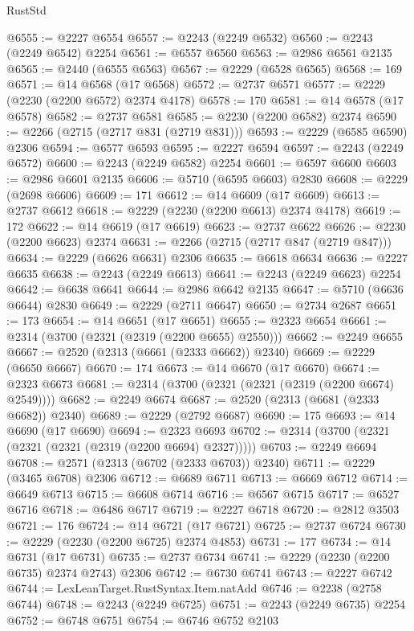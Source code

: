 \begin{lexlean}{RustStd}
\begin{coremodule}
@6555 := @2227 @6554
@6557 := @2243 (@2249 @6532)
@6560 := @2243 (@2249 @6542) @2254
@6561 := @6557 @6560
@6563 := @2986 @6561 @2135
@6565 := @2440 (@6555 @6563)
@6567 := @2229 (@6528 @6565)
@6568 := 169
@6571 := @14 @6568 (@17 @6568)
@6572 := @2737 @6571
@6577 := @2229 (@2230 (@2200 @6572) @2374 @4178)
@6578 := 170
@6581 := @14 @6578 (@17 @6578)
@6582 := @2737 @6581
@6585 := @2230 (@2200 @6582) @2374
@6590 := @2266 (@2715 (@2717 @831 (@2719 @831)))
@6593 := @2229 (@6585 @6590) @2306
@6594 := @6577 @6593
@6595 := @2227 @6594
@6597 := @2243 (@2249 @6572)
@6600 := @2243 (@2249 @6582) @2254
@6601 := @6597 @6600
@6603 := @2986 @6601 @2135
@6606 := @5710 (@6595 @6603) @2830
@6608 := @2229 (@2698 @6606)
@6609 := 171
@6612 := @14 @6609 (@17 @6609)
@6613 := @2737 @6612
@6618 := @2229 (@2230 (@2200 @6613) @2374 @4178)
@6619 := 172
@6622 := @14 @6619 (@17 @6619)
@6623 := @2737 @6622
@6626 := @2230 (@2200 @6623) @2374
@6631 := @2266 (@2715 (@2717 @847 (@2719 @847)))
@6634 := @2229 (@6626 @6631) @2306
@6635 := @6618 @6634
@6636 := @2227 @6635
@6638 := @2243 (@2249 @6613)
@6641 := @2243 (@2249 @6623) @2254
@6642 := @6638 @6641
@6644 := @2986 @6642 @2135
@6647 := @5710 (@6636 @6644) @2830
@6649 := @2229 (@2711 @6647)
@6650 := @2734 @2687
@6651 := 173
@6654 := @14 @6651 (@17 @6651)
@6655 := @2323 @6654
@6661 := @2314 (@3700 (@2321 (@2319 (@2200 @6655) @2550)))
@6662 := @2249 @6655
@6667 := @2520 (@2313 (@6661 (@2333 @6662)) @2340)
@6669 := @2229 (@6650 @6667)
@6670 := 174
@6673 := @14 @6670 (@17 @6670)
@6674 := @2323 @6673
@6681 := @2314 (@3700 (@2321 (@2321 (@2319 (@2200 @6674) @2549))))
@6682 := @2249 @6674
@6687 := @2520 (@2313 (@6681 (@2333 @6682)) @2340)
@6689 := @2229 (@2792 @6687)
@6690 := 175
@6693 := @14 @6690 (@17 @6690)
@6694 := @2323 @6693
@6702 := @2314 (@3700 (@2321 (@2321 (@2321 (@2319 (@2200 @6694) @2327)))))
@6703 := @2249 @6694
@6708 := @2571 (@2313 (@6702 (@2333 @6703)) @2340)
@6711 := @2229 (@3465 @6708) @2306
@6712 := @6689 @6711
@6713 := @6669 @6712
@6714 := @6649 @6713
@6715 := @6608 @6714
@6716 := @6567 @6715
@6717 := @6527 @6716
@6718 := @6486 @6717
@6719 := @2227 @6718
@6720 := @2812 @3503
@6721 := 176
@6724 := @14 @6721 (@17 @6721)
@6725 := @2737 @6724
@6730 := @2229 (@2230 (@2200 @6725) @2374 @4853)
@6731 := 177
@6734 := @14 @6731 (@17 @6731)
@6735 := @2737 @6734
@6741 := @2229 (@2230 (@2200 @6735) @2374 @2743) @2306
@6742 := @6730 @6741
@6743 := @2227 @6742
@6744 := LexLeanTarget.RustSyntax.Item.natAdd
@6746 := @2238 (@2758 @6744)
@6748 := @2243 (@2249 @6725)
@6751 := @2243 (@2249 @6735) @2254
@6752 := @6748 @6751
@6754 := @6746 @6752 @2103

\end{coremodule}
\end{lexlean}
